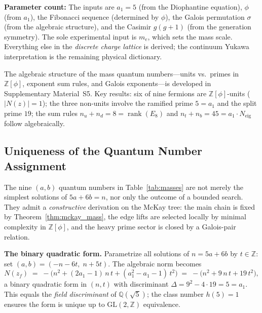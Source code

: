 \documentclass[12pt,a4paper]{article}
\theoremstyle{definition}
\begin{document}
\textbf{Parameter count:} The inputs are $a_1 = 5$ (from the Diophantine equation), $\phi$ (from $a_1$), the Fibonacci sequence (determined by $\phi$), the Galois permutation $\sigma$ (from the algebraic structure), and the Casimir $g(g+1)$ (from the generation symmetry). The sole experimental input is $m_e$, which sets the mass scale. Everything else in the \emph{discrete charge lattice} is derived; the continuum Yukawa interpretation is the remaining physical dictionary.

The algebraic structure of the mass quantum numbers---units vs.\ primes in $\mathbb{Z}[\phi]$, exponent sum rules, and Galois exponents---is developed in Supplementary Material~S5.  Key results: six of nine fermions are $\mathbb{Z}[\phi]$-units ($|N(z)| = 1$); the three non-units involve the ramified prime $5 = a_1$ and the split prime $19$; the sum rules $n_u + n_d = 8 = \operatorname{rank}(E_8)$ and $n_t + n_b = 45 = a_1 \cdot N_{\text{eig}}$ follow algebraically.

\subsection{Uniqueness of the Quantum Number Assignment}
\label{sec:uniqueness}

The nine $(a,b)$ quantum numbers in Table~\ref{tab:masses} are not merely the simplest solutions of $5a + 6b = n$, nor only the outcome of a bounded search.  They admit a \emph{constructive} derivation on the McKay tree: the main chain is fixed by Theorem~\ref{thm:mckay_mass}, the edge lifts are selected locally by minimal complexity in $\mathbb{Z}[\phi]$, and the heavy prime sector is closed by a Galois-pair relation.

\smallskip\noindent\textbf{The binary quadratic form.}
Parametrize all solutions of $n = 5a + 6b$ by $t \in \mathbb{Z}$: set $(a,b) = (-n - 6t,\; n + 5t)$.
The algebraic norm becomes
\begin{equation}
N(z_f) \;=\; -\bigl(n^2 + (2a_1 - 1)\,n\,t + (a_1^2 - a_1 - 1)\,t^2\bigr)
\;=\; -\bigl(n^2 + 9\,n\,t + 19\,t^2\bigr),
\label{eq:norm_quadratic}
\end{equation}
a binary quadratic form in $(n,t)$ with discriminant $\Delta = 9^2 - 4 \cdot 19 = 5 = a_1$.
This equals the \emph{field discriminant} of $\mathbb{Q}(\sqrt{5})$; the class number $h(5) = 1$ ensures the form is unique up to $\mathrm{GL}(2,\mathbb{Z})$ equivalence.
\end{document}
